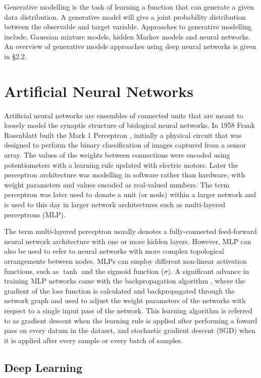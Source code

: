 Generative modelling is the task of learning a function that can generate a given data distribution. 
A generative model will give a joint probability distribution between the observable and target variable. 
Approaches to generative modelling include, Gaussian mixture models, hidden Markov models and neural networks. 
An overview of generative models approaches using deep neural networks is given in \S2.2.

\section{Artificial Neural Networks}

Artificial neural networks are ensembles of connected units that are meant to loosely model the synaptic structure of biological neural networks. 
In 1958 Frank Rosenblatt built the Mark 1 Perceptron \citep{rosenblatt1958perceptron}, initially a physical circuit that was designed to perform the binary classification of images captured from a sensor array. 
The values of the weights between connections were encoded using potentiometers with a learning rule updated with electric motors. 
Later the perceptron architecture was modelling in software rather than hardware, with weight parameters and values encoded as real-valued numbers. 
The term perceptron was later used to donate a unit (or node) within a larger network and is used to this day in larger network architectures such as multi-layered perceptrons (MLP). 

The term multi-layered perceptron usually denotes a fully-connected feed-forward neural network architecture with one or more hidden layers. 
However, MLP can also be used to refer to neural networks with more complex topological arrangements between nodes. 
MLPs can employ different non-linear activation functions, such as $\tanh$ and the sigmoid function ($\sigma$). 
A significant advance in training MLP networks came with the backpropagation algorithm \citep{werbos1974beyond}, where the gradient of the loss function is calculated and backpropagated through the network graph and used to adjust the weight parameters of the networks with respect to a single input pass of the network. 
This learning algorithm is referred to as gradient descent when the learning rule is applied after performing a foward pass on every datum in the dataset, and stochastic gradient descent (SGD) when it is applied after every sample or every batch of samples. 

\subsection{Deep Learning}

